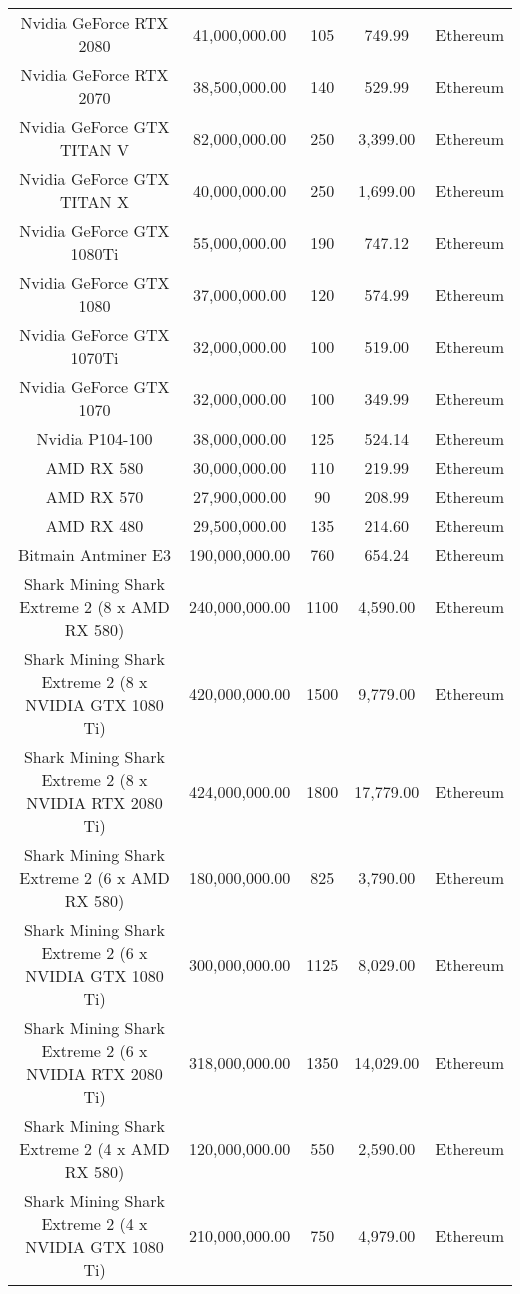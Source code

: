 \begin{table}[!ht]
{\begin{tabular}{|c|c|c|c|c|}
        Nvidia GeForce RTX 2080 & 41,000,000.00 & 105 & 749.99 & Ethereum \\
        Nvidia GeForce RTX 2070 & 38,500,000.00 & 140 & 529.99 & Ethereum \\
        Nvidia GeForce GTX TITAN V & 82,000,000.00 & 250 & 3,399.00 & Ethereum \\
        Nvidia GeForce GTX TITAN X & 40,000,000.00 & 250 & 1,699.00 & Ethereum \\
        Nvidia GeForce GTX 1080Ti & 55,000,000.00 & 190 & 747.12 & Ethereum \\
        Nvidia GeForce GTX 1080 & 37,000,000.00 & 120 & 574.99 & Ethereum \\
        Nvidia GeForce GTX 1070Ti & 32,000,000.00 & 100 & 519.00 & Ethereum \\
        Nvidia GeForce GTX 1070 & 32,000,000.00 & 100 & 349.99 & Ethereum \\
        Nvidia P104-100 & 38,000,000.00 & 125 & 524.14 & Ethereum \\
        AMD RX 580 & 30,000,000.00 & 110 & 219.99 & Ethereum \\
        AMD RX 570 & 27,900,000.00 & 90 & 208.99 & Ethereum \\
        AMD RX 480 & 29,500,000.00 & 135 & 214.60 & Ethereum \\
        Bitmain Antminer E3 & 190,000,000.00 & 760 & 654.24 & Ethereum \\
        Shark Mining Shark Extreme 2 (8 x AMD RX 580) & 240,000,000.00 & 1100 & 4,590.00 & Ethereum \\
        Shark Mining Shark Extreme 2 (8 x NVIDIA GTX 1080 Ti) & 420,000,000.00 & 1500 & 9,779.00 & Ethereum \\
        Shark Mining Shark Extreme 2 (8 x NVIDIA RTX 2080 Ti) & 424,000,000.00 & 1800 & 17,779.00 & Ethereum \\
        Shark Mining Shark Extreme 2 (6 x AMD RX 580) & 180,000,000.00 & 825 & 3,790.00 & Ethereum \\
        Shark Mining Shark Extreme 2 (6 x NVIDIA GTX 1080 Ti) & 300,000,000.00 & 1125 & 8,029.00 & Ethereum \\
        Shark Mining Shark Extreme 2 (6 x NVIDIA RTX 2080 Ti) & 318,000,000.00 & 1350 & 14,029.00 & Ethereum \\
        Shark Mining Shark Extreme 2 (4 x AMD RX 580) & 120,000,000.00 & 550 & 2,590.00 & Ethereum \\
        Shark Mining Shark Extreme 2 (4 x NVIDIA GTX 1080 Ti) & 210,000,000.00 & 750 & 4,979.00 & Ethereum \\

\end{tabular}}
\end{table}
